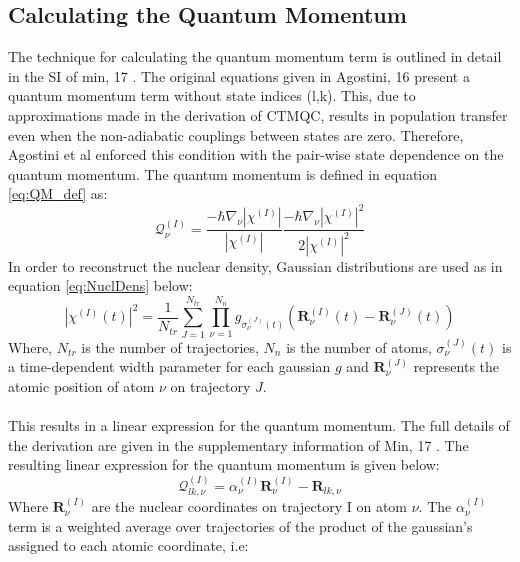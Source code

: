  \subsection{Calculating the Quantum Momentum \label{sec:calc_QM}}
 \label{sect:QM_Calc}
 The technique for calculating the quantum momentum term is outlined in detail in the SI of min, 17 \cite{min_ab_2017}. The original equations given in Agostini, 16\cite{agostini_quantum-classical_2016} present a quantum momentum term without state indices (l,k). This, due to approximations made in the derivation of CTMQC, results in population transfer even when the non-adiabatic couplings between states are zero. Therefore, Agostini et al enforced this condition with the pair-wise state dependence on the quantum momentum. The quantum momentum is defined in equation \eqref{eq:QM_def} as:
\begin{equation}
  \mathcal{Q}_{\nu}^{(I)} = \frac{-\hbar \nabla_{\nu} |\chi^{(I)}|}{|\chi^{(I)}|} \frac{-\hbar \nabla_{\nu}                            |\chi^{(I)}|^2}{2|\chi^{(I)}|^2}
  \label{eq:QM_def}
\end{equation}
In order to reconstruct the nuclear density, Gaussian distributions are used as in equation \eqref{eq:NuclDens} below:
\begin{equation}
	|\chi^{(I)}(t)|^2 = \frac{1}{N_{tr}} \sum_{J=1}^{N_{tr}} \prod_{\nu=1}^{N_n} g_{\sigma_{\nu}^{(J)}(t)} \left(\mathbf{R}_{\nu}^{(I)}(t) - \mathbf{R}_{\nu}^{(J)}(t)\right)
	\label{eq:NuclDens}
\end{equation}
Where, $N_{tr}$ is the number of trajectories, $N_{n}$ is the number of atoms, $\sigma_{\nu}^{(J)}(t)$ is a time-dependent width parameter for each gaussian $g$ and $\mathbf{R}_{\nu}^{(J)}$ represents the atomic position of atom $\nu$ on trajectory $J$.
\\\\
This results in a linear expression for the quantum momentum.
The full details of the derivation are given in the supplementary information of Min, 17 \cite{min_ab_2017}. The resulting linear expression for the quantum momentum is given below:
\begin{equation}
  \mathcal{Q}_{lk, \nu}^{(I)} = \alpha_{\nu}^{(I)} \mathbf{R}_{\nu}^{(I)} - \mathbf{R}_{lk, \nu}
  \label{eq:QM_lin}
\end{equation}
Where $\mathbf{R}_{\nu}^{(I)}$ are the nuclear coordinates on trajectory I on atom $\nu$. The $\alpha_{\nu}^{(I)}$ term is a weighted  average over trajectories of the product of the gaussian's assigned to each atomic coordinate, i.e:
